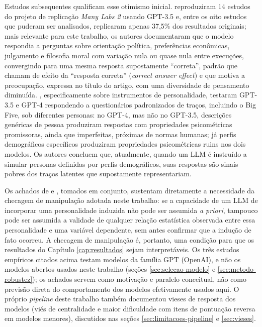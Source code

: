 Estudos subsequentes qualificam esse otimismo inicial. 
reproduziram 14 estudos do projeto de replicação \textit{Many Labs 2}
usando GPT-3.5 e, entre os oito estudos que puderam ser analisados,
replicaram apenas 37,5\% dos resultados originais; mais relevante para
este trabalho, os autores documentaram que o modelo respondia a perguntas
sobre orientação política, preferências econômicas, julgamento e
filosofia moral com variação nula ou quase nula entre execuções,
convergindo para uma mesma resposta supostamente ``correta'', padrão que
chamam de efeito da ``resposta correta'' (\textit{correct answer
effect}) e que motiva a preocupação, expressa no título do artigo, com
uma diversidade de pensamento diminuída. ,
especificamente sobre instrumentos de personalidade, testaram GPT-3.5 e
GPT-4 respondendo a questionários padronizados de traços, incluindo o
Big Five, sob diferentes personas: no GPT-4, mas não no GPT-3.5,
descrições genéricas de pessoa produziram respostas com propriedades
psicométricas promissoras, ainda que imperfeitas, próximas de normas
humanas; já perfis demográficos específicos produziram propriedades
psicométricas ruins nos dois modelos. Os autores concluem que,
atualmente, quando um LLM é instruído a simular personas definidas por
perfis demográficos, suas respostas são sinais pobres dos traços latentes
que supostamente representariam.

Os achados de  e , tomados em
conjunto, sustentam diretamente a necessidade da checagem de manipulação
adotada neste trabalho: se a capacidade de um LLM de incorporar uma
personalidade induzida não pode ser assumida \textit{a priori}, tampouco
pode ser assumida a validade de qualquer relação estatística observada
entre essa personalidade e uma variável dependente, sem antes confirmar
que a indução de fato ocorreu. A checagem de manipulação é, portanto,
uma condição para que os resultados do Capítulo \ref{cap:resultados}
sejam interpretáveis. Os três estudos empíricos citados acima
\cite{argyle2023,park2024,petrov2024} testam modelos da família GPT
(OpenAI), e não os modelos abertos usados neste trabalho (seções
\ref{sec:selecao-modelo} e \ref{sec:metodo-robustez}); os achados servem
como motivação e paralelo conceitual, não como previsão direta do
comportamento dos modelos efetivamente usados aqui. O próprio
\textit{pipeline} deste trabalho também documentou vieses de resposta
dos modelos (viés de centralidade e maior dificuldade com itens de
pontuação reversa em modelos menores), discutidos nas seções
\ref{sec:limitacoes-pipeline} e \ref{sec:vieses}.

